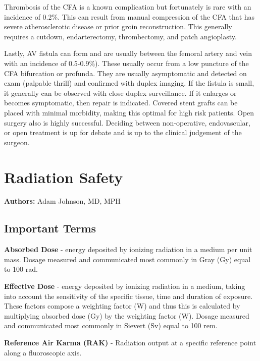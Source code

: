 \documentclass[
]{book}
\begin{document}
Thrombosis of the CFA is a known complication but fortunately is rare
with an incidence of 0.2\%. This can result from manual compression of
the CFA that has severe atherosclerotic disease or prior groin
reconstruction. This generally requires a cutdown, endarterectomy,
thrombectomy, and patch angioplasty.

Lastly, AV fistula can form and are usually between the femoral artery
and vein with an incidence of 0.5-0.9\%). These usually occur from a low
puncture of the CFA bifurcation or profunda. They are usually
asymptomatic and detected on exam (palpable thrill) and confirmed with
duplex imaging. If the fistula is small, it generally can be observed
with close duplex surveillance. If it enlarges or becomes symptomatic,
then repair is indicated. Covered stent grafts can be placed with
minimal morbidity, making this optimal for high risk patients. Open
surgery also is highly successful. Deciding between non-operative,
endovascular, or open treatment is up for debate and is up to the
clinical judgement of the surgeon.

\hypertarget{radiation-safety}{%
\section{Radiation Safety}\label{radiation-safety}}

\textbf{Authors:} Adam Johnson, MD, MPH

\hypertarget{important-terms}{%
\subsection{Important Terms}\label{important-terms}}

\textbf{Absorbed Dose} - energy deposited by ionizing radiation in a medium
per unit mass. Dosage measured and communicated most commonly in Gray
(Gy) equal to 100 rad.\citep{reed2019}

\textbf{Effective Dose} - energy deposited by ionizing radiation in a medium,
taking into account the sensitivity of the specific tissue, time and
duration of exposure. These factors compose a weighting factor (W) and
thus this is calculated by multiplying absorbed dose (Gy) by the
weighting factor (W). Dosage measured and communicated most commonly in
Sievert (Sv) equal to 100 rem.\citep{reed2019}

\textbf{Reference Air Karma (RAK)} - Radiation output at a specific reference
point along a fluoroscopic axis.\citep{kirkwood2013}
\end{document}
